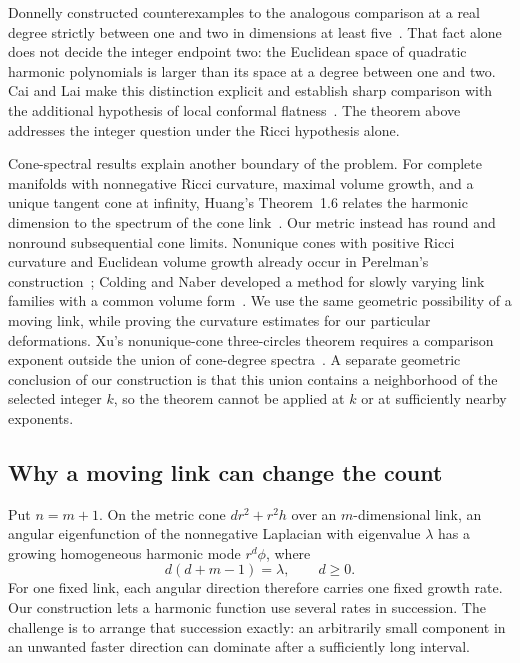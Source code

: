 Donnelly constructed counterexamples to the analogous comparison at a real
degree strictly between one and two in dimensions at least
five~\cite{Donnelly,CaiLai}. That fact alone does not decide the integer
endpoint two: the Euclidean space of quadratic harmonic polynomials is
larger than its space at a degree between one and two. Cai and Lai make
this distinction explicit and establish sharp comparison with the
additional hypothesis of local conformal flatness~\cite{CaiLai}.
The theorem above addresses the integer question under the Ricci
hypothesis alone.

Cone-spectral results explain another boundary of the problem. For complete
manifolds with nonnegative Ricci curvature, maximal volume growth, and a
unique tangent cone at infinity, Huang's
Theorem~1.6 relates the harmonic dimension to the spectrum of the cone
link~\cite{Huang}. Our metric instead has round and nonround subsequential
cone limits. Nonunique cones with positive Ricci curvature and Euclidean
volume growth already occur in Perelman's construction~\cite{Perelman};
Colding and Naber developed a method for slowly varying link
families with a common volume form~\cite{ColdingNaber}. We use the same geometric possibility of a
moving link, while proving the curvature estimates for our particular
deformations. Xu's nonunique-cone three-circles theorem requires a comparison
exponent outside the union of cone-degree spectra~\cite[Theorem~3.4]{Xu}.
A separate geometric conclusion of our construction is that this union
contains a neighborhood of the selected integer $k$, so the theorem cannot
be applied at $k$ or at sufficiently nearby exponents.

\subsection*{Why a moving link can change the count}

Put $n=m+1$. On the metric cone $dr^2+r^2h$ over an $m$-dimensional link,
an angular eigenfunction of the nonnegative Laplacian with eigenvalue
$\lambda$ has a growing homogeneous harmonic mode $r^d\phi$, where
\[
 d(d+m-1)=\lambda,\qquad d\geq0.
\]
For one fixed link, each angular direction therefore carries one fixed
growth rate. Our construction lets a harmonic function use several rates
in succession. The challenge is to arrange that succession exactly:
an arbitrarily small component in an unwanted faster direction can dominate
after a sufficiently long interval.

